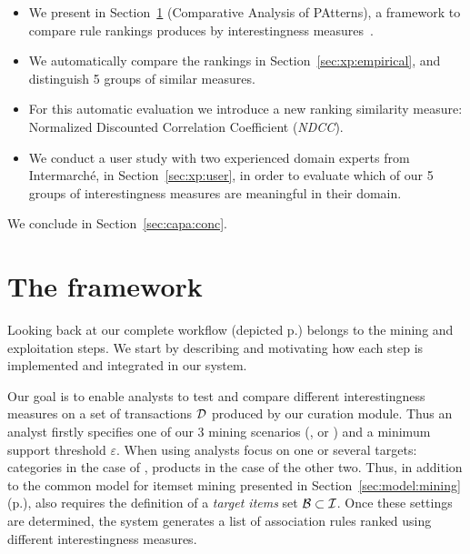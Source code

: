 \begin{itemize}
  \item We present in Section~\ref{sec:capa} \capa (Comparative Analysis of PAtterns),
    a framework to compare rule rankings produces by \nbm interestingness measures~\cite{GengACM06,Lenca2007}.%

  \item We automatically compare the \nbm rankings in Section~\ref{sec:xp:empirical},
    and distinguish 5 groups of similar measures.%

  \item For this automatic evaluation we introduce a new ranking similarity measure:
    Normalized Discounted Correlation Coefficient ({\em NDCC}).

  \item We conduct a user study with two experienced domain experts from Intermarch\'e, in Section~\ref{sec:xp:user},
    in order to evaluate which of our 5 groups of interestingness measures are meaningful in their domain.
\end{itemize}



We conclude in Section~\ref{sec:capa:conc}.




\section{The \capa framework}
\label{sec:capa}

Looking back at our complete workflow (depicted p.\pageref{fig:archoverview})
\capa belongs to the mining and exploitation steps.
We start by describing and motivating how each step is implemented and integrated in our system.

Our goal is to enable analysts to test and compare different interestingness measures
on a set of transactions $\cal D$ produced by our curation module.
Thus an analyst firstly specifies one of our 3 mining scenarios (\demoassoc, \prodassocreceipt or \prodassocclient)
and a minimum support threshold $\varepsilon$.
When using \capa analysts focus on one or several targets:
categories in the case of \demoassoc, products in the case of the other two.
Thus, in addition to the common model for itemset mining presented in
Section~\ref{sec:model:mining} (p.\pageref{sec:model:mining}),
\capa also requires the definition of a {\em target items} set ${\cal B} \subset {\cal I}$.
Once these settings are determined,
the system generates a list of association rules ranked using different interestingness measures.

